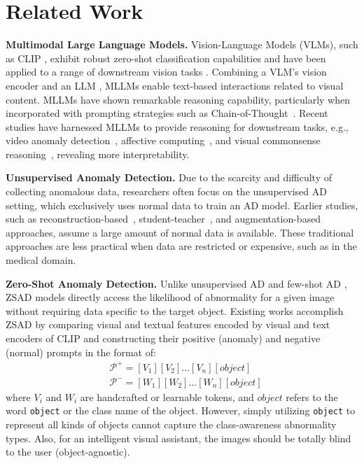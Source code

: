 \section{Related Work}

\noindent \textbf{Multimodal Large Language Models.}
Vision-Language Models (VLMs), such as CLIP \cite{clip}, exhibit robust zero-shot classification capabilities and have been applied to a range of downstream vision tasks \cite{lin2023clip, liang2023open, chen2023clip2scene, liu2023clip, wang2023clipn}. Combining a VLM's vision encoder and an LLM \cite{bert, roberta, t5}, MLLMs \cite{blip, blip2, llava, zhu2024minigpt, instructblip} enable text-based interactions related to visual content. MLLMs have shown remarkable reasoning capability, particularly when incorporated with prompting strategies such as Chain-of-Thought~\cite{wei2022chain, lu2022learn, zhang2024multimodal}. Recent studies have harnessed MLLMs to provide reasoning for downstream tasks, e.g., video anomaly detection~\cite{lv2024video,yang2024follow}, affective computing~\cite{cheng2024emotion,guo2024stimuvar}, and visual commonsense reasoning~\cite{zhou2024vicor}, revealing more interpretability.

\medskip
\noindent \textbf{Unsupervised Anomaly Detection.}
Due to the scarcity and difficulty of collecting anomalous data, researchers often focus on the unsupervised AD setting, which exclusively uses normal data to train an AD model. Earlier studies, such as reconstruction-based~\cite{lo2022adversarially,mou2023rgi,zavrtanik2021draem}, student-teacher~\cite{deng2022anomaly,tien2023revisiting,zhang2023destseg}, and augmentation-based~\cite{li2021cutpaste} approaches, assume a large amount of normal data is available. These traditional approaches are less practical when data are restricted or expensive, such as in the medical domain.

\medskip
\noindent \textbf{Zero-Shot Anomaly Detection.} Unlike unsupervised AD \cite{roth2022towards, huang2022registration} and few-shot AD \cite{zhu2024toward, li2024promptad, gu2024anomalygpt, fang2023fastrecon, huang2024adapting}, ZSAD models directly access the likelihood of abnormality for a given image without requiring data specific to the target object. Existing works \cite{jeong2023winclip, zhou2024anomalyclip, cao2025adaclip, deng2023anovl} accomplish ZSAD by comparing visual and textual features encoded by visual and text encoders of CLIP and constructing their positive (anomaly) and negative (normal) prompts in the format of:
\begin{align*}
&\mathcal{P}^{+}=[V_{1}][V_{2}]...[V_{n}][object] \\
&\mathcal{P}^{-}=[W_{1}][W_{2}]...[W_{n}][object]
\end{align*}
where $V_{i}$ and $W_{i}$ are handcrafted or learnable tokens, and $object$ refers to the word \texttt{object} or the class name of the object. However, simply utilizing \texttt{object} to represent all kinds of objects cannot capture the class-awareness abnormality types. Also, for an intelligent visual assistant, the images should be totally blind to the user (object-agnostic). 

